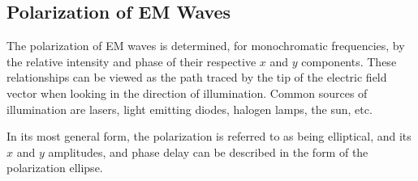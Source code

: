\subsection{Polarization of EM Waves}
The polarization of EM waves is determined, for monochromatic frequencies, by the relative intensity and phase of their respective $x$ and $y$ components.  These relationships can be viewed as the path traced by the tip of the electric field vector when looking in the direction of illumination.  Common sources of illumination are lasers, light emitting diodes, halogen lamps, the sun, etc.

In its most general form, the polarization is referred to as being elliptical, and its $x$ and $y$ amplitudes, and phase delay can be described in the form of the polarization ellipse.

